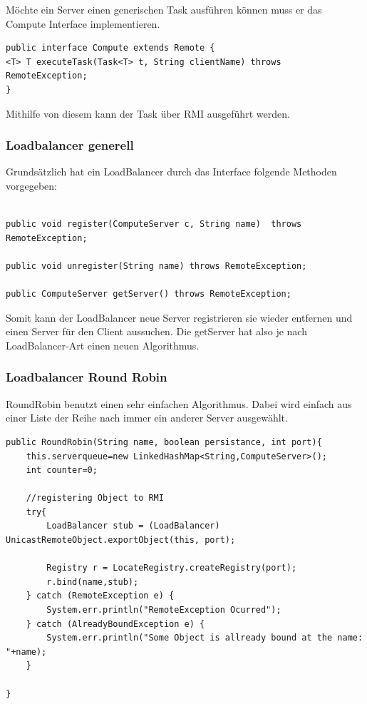 Möchte ein Server einen generischen Task ausführen können muss er das Compute Interface implementieren. 

\begin{lstlisting}[style=Java, caption=Compute Interface]	
public interface Compute extends Remote {
<T> T executeTask(Task<T> t, String clientName) throws RemoteException;
}
\end{lstlisting}

Mithilfe von diesem kann der Task über RMI ausgeführt werden. 

\clearpage
\subsubsection{Loadbalancer generell}
Grundsätzlich hat ein LoadBalancer durch das Interface folgende Methoden vorgegeben: 
\begin{lstlisting}[style=Java, caption=Loadbalancer Interface]	

public void register(ComputeServer c, String name)  throws RemoteException;

public void unregister(String name) throws RemoteException;

public ComputeServer getServer() throws RemoteException;

\end{lstlisting}

Somit kann der LoadBalancer neue Server registrieren sie wieder entfernen und einen Server für den Client aussuchen. 
Die getServer hat also je nach LoadBalancer-Art einen neuen Algorithmus.

\subsubsection{Loadbalancer Round Robin}
RoundRobin benutzt einen sehr einfachen Algorithmus. Dabei wird einfach aus einer Liste der Reihe nach immer ein anderer Server ausgewählt. 
\begin{lstlisting}[style=Java, caption=RoundRobin Konstruktor]	
 public RoundRobin(String name, boolean persistance, int port){
	this.serverqueue=new LinkedHashMap<String,ComputeServer>();
	int counter=0;
	
	//registering Object to RMI
	try{
		LoadBalancer stub = (LoadBalancer) UnicastRemoteObject.exportObject(this, port);
		
		Registry r = LocateRegistry.createRegistry(port);
		r.bind(name,stub);
	} catch (RemoteException e) {
		System.err.println("RemoteException Ocurred");
	} catch (AlreadyBoundException e) {
		System.err.println("Some Object is allready bound at the name: "+name);
	}
	
}
\end{lstlisting}

